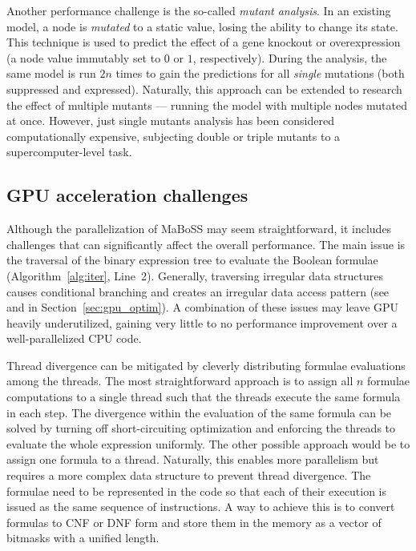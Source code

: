 Another performance challenge is the so-called \emph{mutant analysis}. In an existing model, a node is \emph{mutated} to a static value, losing the ability to change its state. This technique is used to predict the effect of a gene knockout or overexpression (a node value immutably set to $0$ or $1$, respectively). During the analysis, the same model is run $2n$ times to gain the predictions for all \emph{single} mutations (both suppressed and expressed). Naturally, this approach can be extended to research the effect of multiple mutants --- running the model with multiple nodes mutated at once. However, just single mutants analysis has been considered computationally expensive, subjecting double or triple mutants to a supercomputer-level task.

\subsection{GPU acceleration challenges}

Although the parallelization of MaBoSS may seem straightforward, it includes challenges that can significantly affect the overall performance. The main issue is the traversal of the binary expression tree to evaluate the Boolean formulae (Algorithm~\ref{alg:iter}, Line~2). Generally, traversing irregular data structures causes conditional branching and creates an irregular data access pattern (see  and  in Section~\ref{sec:gpu_optim}). A combination of these issues may leave GPU heavily underutilized, gaining very little to no performance improvement over a well-parallelized CPU code.

Thread divergence can be mitigated by cleverly distributing formulae evaluations among the threads. The most straightforward approach is to assign all $n$ formulae computations to a single thread such that the threads execute the same formula in each step. The divergence within the evaluation of the same formula can be solved by turning off short-circuiting optimization and enforcing the threads to evaluate the whole expression uniformly.
The other possible approach would be to assign one formula to a thread. Naturally, this enables more parallelism but requires a more complex data structure to prevent thread divergence. The formulae need to be represented in the code so that each of their execution is issued as the same sequence of instructions. A way to achieve this is to convert formulas to CNF or DNF form and store them in the memory as a vector of bitmasks with a unified length.

